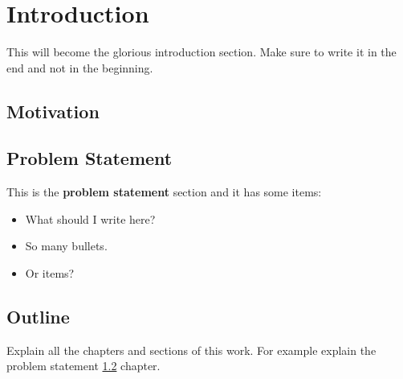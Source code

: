 \chapter{Introduction}

This will become the glorious introduction section. Make sure to write it in
the end and not in the beginning.

\section{Motivation}


\section{Problem Statement}
\label{problem_statement}
This is the \textbf{problem statement} section and it has some items:
\begin{itemize}
\item What should I write here?
\item So many bullets.
\item Or items?
\end{itemize}

\section{Outline}
Explain all the chapters and sections of this work. For example explain the problem statement
\ref{problem_statement} chapter.
